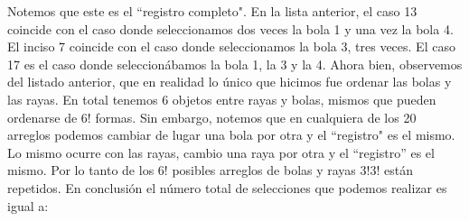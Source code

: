 \documentclass[14pt]{extreport}
\begin{document}
\begin{center}
 \end{center}
Notemos que este es el ``registro completo". En la lista anterior, el caso 13 coincide con el caso donde seleccionamos dos veces la bola 1 y una vez la bola 4. El inciso 7 coincide con el caso donde seleccionamos la bola 3, tres veces. El caso 17 es el caso donde seleccionábamos la bola 1, la 3 y la 4. Ahora bien, observemos del listado anterior, que en realidad lo único que hicimos fue ordenar las bolas y las rayas. En total tenemos 6 objetos entre rayas y bolas, mismos que pueden ordenarse de $6!$ formas. Sin embargo, notemos que en cualquiera de los 20 arreglos podemos cambiar de lugar una bola por otra y el ``registro" es el mismo. Lo mismo ocurre con las rayas, cambio una raya por otra y el ``registro'' es el mismo. Por lo tanto de los $6!$ posibles arreglos de bolas y rayas $3!3!$ están repetidos. En conclusión el número total de selecciones que podemos realizar es igual a: 
\end{document}
